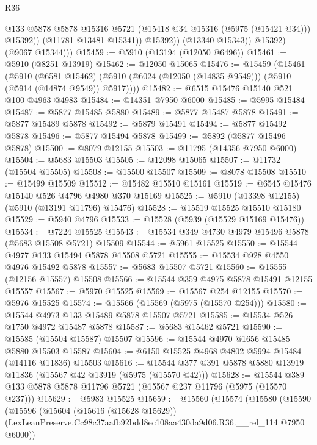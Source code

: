 \begin{lexlean}{R36}
\begin{coremodule}
                      @133
                      @5878
                      @5878
                      @15316
                      @5721
                      (@15418 @34 @15316 (@5975 (@15421 @34)))
                      @15392))
                  (@11781 @13481 @15341))
                @15392))
            (@13340 @15343))
          @15392)
        (@9067 @15344)))
@15459 := @5910 (@13194 (@12050 @6496))
@15461 := @5910 (@8251 @13919)
@15462 := @12050 @15065
@15476 := @15459
    (@15461
      (@5910
        (@6581 @15462)
        (@5910 (@6024 (@12050 (@14835 @9549))) (@5910 (@5914 (@14874 @9549)) @5917))))
@15482 := @6515 @15476 @15140 @521 @100 @4963 @4983
@15484 := @14351 @7950 @6000
@15485 := @5995 @15484
@15487 := @5877 @15485 @5880
@15489 := @5877 @15487 @5878
@15491 := @5877 @15489 @5878
@15492 := @5879 @15491
@15494 := @5877 @15492 @5878
@15496 := @5877 @15494 @5878
@15499 := @5892 (@5877 @15496 @5878)
@15500 := @8079 @12155
@15503 := @11795 (@14356 @7950 @6000)
@15504 := @5683 @15503
@15505 := @12098 @15065
@15507 := @11732 (@15504 @15505)
@15508 := @15500 @15507
@15509 := @8078 @15508
@15510 := @15499 @15509
@15512 := @15482 @15510 @15161
@15519 := @6545 @15476 @15140 @526 @4796 @4980 @370 @15169
@15525 := @5910 (@13398 @12155) (@5910 (@13191 @11796) @15476)
@15528 := @15519 @15525 @15510 @15180
@15529 := @5940 @4796
@15533 := @15528 (@5939 (@15529 @15169 @15476))
@15534 := @7224 @15525
@15543 := @15534 @349 @4730 @4979 @15496 @5878 (@5683 @15508 @5721) @15509
@15544 := @5961 @15525
@15550 := @15544 @4977 @133 @15494 @5878 @15508 @5721
@15555 := @15534 @928 @4550 @4976 @15492 @5878
@15557 := @5683 @15507 @5721
@15560 := @15555 (@12156 @15557) @15508
@15566 := @15544 @359 @4975 @5878 @15491 @12155 @15557
@15567 := @5970 @15525
@15569 := @15567 @254 @12155
@15570 := @5976 @15525
@15574 := @15566 (@15569 (@5975 (@15570 @254)))
@15580 := @15544 @4973 @133 @15489 @5878 @15507 @5721
@15585 := @15534 @526 @1750 @4972 @15487 @5878
@15587 := @5683 @15462 @5721
@15590 := @15585 (@15504 @15587) @15507
@15596 := @15544 @4970 @1656 @15485 @5880 @15503 @15587
@15604 := @6150 @15525 @4968 @4802 @5994 @15484 (@14116 @11836) @15503
@15616 := @15544 @377 @391 @5878 @5880 @13919 @11836 (@15567 @42 @13919 (@5975 (@15570 @42)))
@15628 := @15544 @389 @133 @5878 @5878 @11796 @5721 (@15567 @237 @11796 (@5975 (@15570 @237)))
@15629 := @5983 @15525
@15659 := @15560
    (@15574
      (@15580
        (@15590
          (@15596
            (@15604
              (@15616 (@15628 @15629))
              (LexLeanPreserve.Cc98c37aafb92bdd8ec108aa430da9d06.R36.__rel_114 @7950 @6000))

\end{coremodule}
\end{lexlean}
